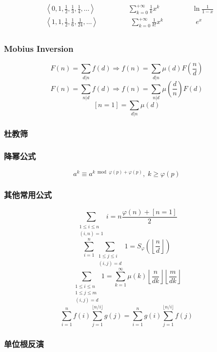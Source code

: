 \begin{align*}
&\left\langle 0, 1, \frac{1}{2}, \frac{1}{3}, \frac{1}{4}, \ldots \right\rangle \hspace{2cm} \sum_{k=0}^{+\infty} \frac{1}{k} x^k \hspace{2cm} \ln \frac{1}{1-x} \\
&\left\langle 1, 1, \frac{1}{2}, \frac{1}{6}, \frac{1}{24}, \ldots \right\rangle \hspace{2cm} \sum_{k=0}^{+\infty} \frac{1}{k!} x^k \hspace{2cm} e^x \\
\end{align*}


\subsubsection{Mobius Inversion}
    \[F(n)=\sum_{d|n}f(d)\Rightarrow f(n)=\sum_{d|n}\mu(d)F\left(\frac{n}{d}\right)\]
    \[F(n)=\sum_{n|d}f(d)\Rightarrow f(n)=\sum_{n|d}\mu\left(\frac{d}{n}\right)F(d)\]
    \[ [n=1] = \sum_{d|n}\mu(d) \]
    
\subsubsection{杜教筛}
    
    
\subsubsection{降幂公式}
    \[ a^k \equiv a ^ {k \bmod \varphi(p) + \varphi(p)},\; k \ge \varphi(p) \]

\subsubsection{其他常用公式}
    \[ \sum_{\substack{1 \le i \le n \\ (i, n) = 1}} i = n \frac {\varphi(n) + [n=1]} 2 \]
    \[ \sum_{i=1}^n \sum_{\substack{1 \le j \le i \\ (i,j)=d}} 1 = S_\varphi \left( \left\lfloor \frac n d \right\rfloor \right) \]
    \[ \sum_{\substack{1 \le i \le n \\ 1 \le j \le m \\ (i, j) = d}} 1 = \sum_{k=1}^{\infty} \mu(k) \left\lfloor \frac n {dk} \right\rfloor \left\lfloor \frac m {dk} \right\rfloor \]
    \[ \sum_{i=1}^n f(i) \sum_{j=1}^{\lfloor n/i \rfloor} g(j) = \sum_{i=1}^n g(i) \sum_{j=1}^{\lfloor n/i \rfloor} f(j) \]

\subsubsection{单位根反演}


